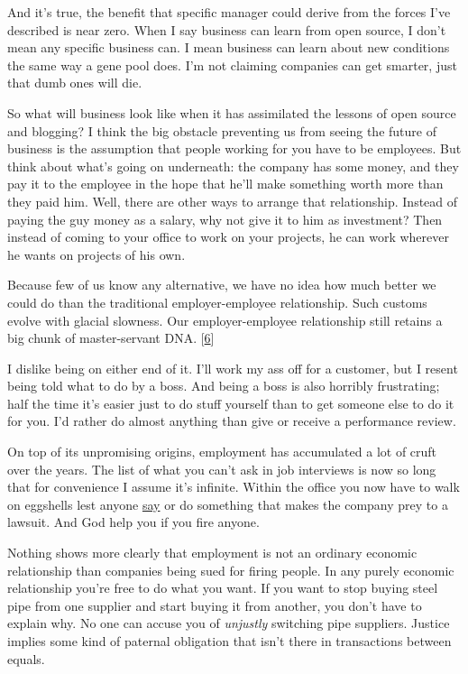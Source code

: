 And it's true, the benefit that specific manager could derive from the
forces I've described is near zero. When I say business can learn from
open source, I don't mean any specific business can. I mean business can
learn about new conditions the same way a gene pool does. I'm not
claiming companies can get smarter, just that dumb ones will die.

So what will business look like when it has assimilated the lessons of
open source and blogging? I think the big obstacle preventing us from
seeing the future of business is the assumption that people working for
you have to be employees. But think about what's going on underneath:
the company has some money, and they pay it to the employee in the hope
that he'll make something worth more than they paid him. Well, there are
other ways to arrange that relationship. Instead of paying the guy money
as a salary, why not give it to him as investment? Then instead of
coming to your office to work on your projects, he can work wherever he
wants on projects of his own.

Because few of us know any alternative, we have no idea how much better
we could do than the traditional employer-employee relationship. Such
customs evolve with glacial slowness. Our employer-employee relationship
still retains a big chunk of master-servant DNA. {[}\hyperref[f6n]{6}{]}

I dislike being on either end of it. I'll work my ass off for a
customer, but I resent being told what to do by a boss. And being a boss
is also horribly frustrating; half the time it's easier just to do stuff
yourself than to get someone else to do it for you. I'd rather do almost
anything than give or receive a performance review.

On top of its unpromising origins, employment has accumulated a lot of
cruft over the years. The list of what you can't ask in job interviews
is now so long that for convenience I assume it's infinite. Within the
office you now have to walk on eggshells lest anyone
\href{say.html}{say} or do something that makes the company prey to a
lawsuit. And God help you if you fire anyone.

Nothing shows more clearly that employment is not an ordinary economic
relationship than companies being sued for firing people. In any purely
economic relationship you're free to do what you want. If you want to
stop buying steel pipe from one supplier and start buying it from
another, you don't have to explain why. No one can accuse you of
\emph{unjustly} switching pipe suppliers. Justice implies some kind of
paternal obligation that isn't there in transactions between equals.

